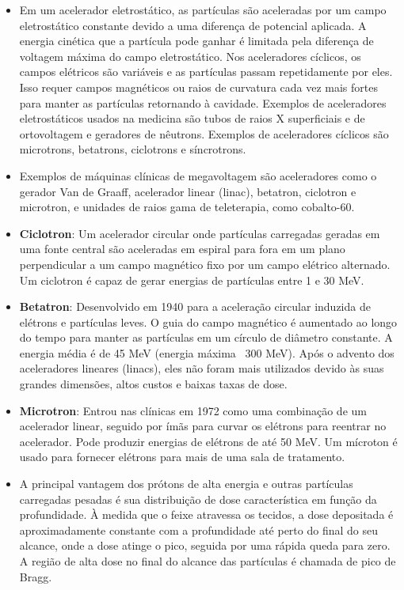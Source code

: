 \documentclass[11pt,a4paper]{article}
\newcounter{exemplo}
\begin{document}
\begin{exemplo}
\begin{itemize}
        \item Em um acelerador eletrostático, as partículas são aceleradas por um campo eletrostático constante devido a uma diferença de potencial aplicada. A energia cinética que a partícula pode ganhar é limitada pela diferença de voltagem máxima do campo eletrostático. Nos aceleradores cíclicos, os campos elétricos são variáveis e as partículas passam repetidamente por eles. Isso requer campos magnéticos ou raios de curvatura cada vez mais fortes para manter as partículas retornando à cavidade. Exemplos de aceleradores eletrostáticos usados na medicina são tubos de raios X superficiais e de ortovoltagem e geradores de nêutrons. Exemplos de aceleradores cíclicos são microtrons, betatrons, ciclotrons e síncrotrons.
        
        \item Exemplos de máquinas clínicas de megavoltagem são aceleradores como o gerador Van de Graaff, acelerador linear (linac), betatron, ciclotron e microtron, e unidades de raios gama de teleterapia, como cobalto-60.
        
        \item \textbf{Ciclotron}: Um acelerador circular onde partículas carregadas geradas em uma fonte central são aceleradas em espiral para fora em um plano perpendicular a um campo magnético fixo por um campo elétrico alternado. Um ciclotron é capaz de gerar energias de partículas entre 1 e 30 MeV.
        
        \item \textbf{Betatron}: Desenvolvido em 1940 para a aceleração circular induzida de elétrons e partículas leves. O guia do campo magnético é aumentado ao longo do tempo para manter as partículas em um círculo de diâmetro constante. A energia média é de 45 MeV (energia máxima ~300 MeV). Após o advento dos aceleradores lineares (linacs), eles não foram mais utilizados devido às suas grandes dimensões, altos custos e baixas taxas de dose.
        
        \item \textbf{Microtron}: Entrou nas clínicas em 1972 como uma combinação de um acelerador linear, seguido por ímãs para curvar os elétrons para reentrar no acelerador. Pode produzir energias de elétrons de até 50 MeV. Um mícroton é usado para fornecer elétrons para mais de uma sala de tratamento.
        
        \item A principal vantagem dos prótons de alta energia e outras partículas carregadas pesadas é sua distribuição de dose característica em função da profundidade. À medida que o feixe atravessa os tecidos, a dose depositada é aproximadamente constante com a profundidade até perto do final do seu alcance, onde a dose atinge o pico, seguida por uma rápida queda para zero. A região de alta dose no final do alcance das partículas é chamada de pico de Bragg.
        

\end{itemize}
\end{exemplo}
\end{document}
